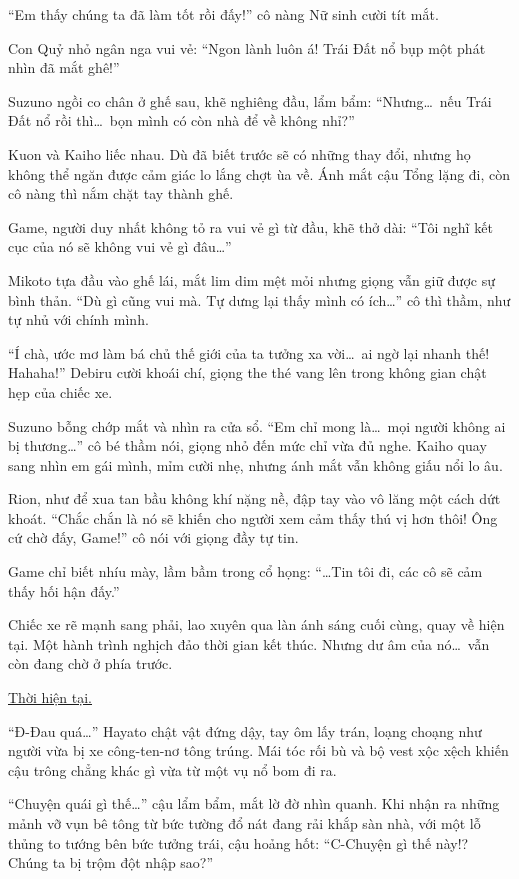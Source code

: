 \documentclass[../main.tex]{subfiles}
\begin{document}
``Em thấy chúng ta đã làm tốt rồi đấy!'' cô nàng Nữ sinh cười tít mắt.

Con Quỷ nhỏ ngân nga vui vẻ: ``Ngon lành luôn á! Trái Đất nổ bụp một phát nhìn đã mắt ghê!''

Suzuno ngồi co chân ở ghế sau, khẽ nghiêng đầu, lẩm bẩm: ``Nhưng\dots\ nếu Trái Đất nổ rồi thì\dots\ bọn mình có còn nhà để về không nhỉ?''

Kuon và Kaiho liếc nhau. Dù đã biết trước sẽ có những thay đổi, nhưng họ không thể ngăn được cảm giác lo lắng chợt ùa về. Ánh mắt cậu Tổng lặng đi, còn cô nàng thì nắm chặt tay thành ghế.

Game, người duy nhất không tỏ ra vui vẻ gì từ đầu, khẽ thở dài: ``Tôi nghĩ kết cục của nó sẽ không vui vẻ gì đâu\dots''

Mikoto tựa đầu vào ghế lái, mắt lim dim mệt mỏi nhưng giọng vẫn giữ được sự bình thản. ``Dù gì cũng vui mà. Tự dưng lại thấy mình có ích\dots'' cô thì thầm, như tự nhủ với chính mình.

``Í chà, ước mơ làm bá chủ thế giới của ta tưởng xa vời\dots\ ai ngờ lại nhanh thế! Hahaha!'' Debiru cười khoái chí, giọng the thé vang lên trong không gian chật hẹp của chiếc xe.

Suzuno bỗng chớp mắt và nhìn ra cửa sổ. ``Em chỉ mong là\dots\ mọi người không ai bị thương\dots'' cô bé thầm nói, giọng nhỏ đến mức chỉ vừa đủ nghe. Kaiho quay sang nhìn em gái mình, mỉm cười nhẹ, nhưng ánh mắt vẫn không giấu nổi lo âu.

Rion, như để xua tan bầu không khí nặng nề, đập tay vào vô lăng một cách dứt khoát. ``Chắc chắn là nó sẽ khiến cho người xem cảm thấy thú vị hơn thôi! Ông cứ chờ đấy, Game!'' cô nói với giọng đầy tự tin.

Game chỉ biết nhíu mày, lầm bầm trong cổ họng: ``\dots Tin tôi đi, các cô sẽ cảm thấy hối hận đấy.''

Chiếc xe rẽ mạnh sang phải, lao xuyên qua làn ánh sáng cuối cùng, quay về hiện tại. Một hành trình nghịch đảo thời gian kết thúc. Nhưng dư âm của nó\dots\ vẫn còn đang chờ ở phía trước.

\begin{center}
  \uline{Thời hiện tại.}
\end{center}

``Đ-Đau quá\dots'' Hayato chật vật đứng dậy, tay ôm lấy trán, loạng choạng như người vừa bị xe công-ten-nơ tông trúng. Mái tóc rối bù và bộ vest xộc xệch khiến cậu trông chẳng khác gì vừa từ một vụ nổ bom đi ra.

``Chuyện quái gì thế\dots'' cậu lẩm bẩm, mắt lờ đờ nhìn quanh. Khi nhận ra những mảnh vỡ vụn bê tông từ bức tường đổ nát đang rải khắp sàn nhà, với một lỗ thủng to tướng bên bức tưởng trái, cậu hoảng hốt: ``C-Chuyện gì thế này!? Chúng ta bị trộm đột nhập sao?''
\end{document}

